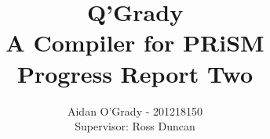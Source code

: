 \documentclass[11pt, a4paper]{article}
\begin{document}
\title{Q'Grady \\A Compiler for PRiSM \\
\large{Progress Report Two}}
\author{Aidan O'Grady - 201218150\\Supervisor: Ross Duncan}
\date{}
\maketitle
\tableofcontents
\newpage


\end{document}
